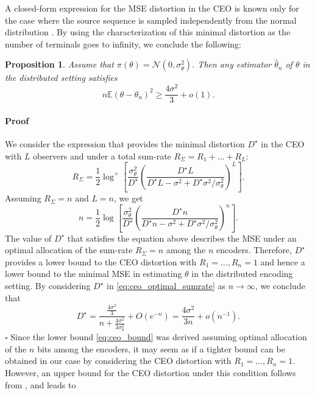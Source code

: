\documentclass[letterpaper, conference]{IEEEtran}      %
\newtheorem{prop}[thm]{\bf {Proposition}}
\newenvironment{proof}{\paragraph*{Proof}}{\hfill$\square$ \newline}
\begin{document}
A closed-form expression for the MSE distortion in the CEO is known only for the case where the source sequence is sampled independently from the normal distribution \cite{prabhakaran2004rate}. By using the characterization of this minimal distortion as the number of terminals goes to infinity, we conclude the following:
\begin{prop} \label{prop:ceo_lower_bound}
Assume that $\pi(\theta) = \mathcal N(0,\sigma_\theta^2)$. Then any estimator $\widehat{\theta}_n$ of $\theta$ in 
the distributed setting satisfies
\begin{equation} \label{eq:ceo_bound}
 n\mathbb E \left( \theta - \theta_n \right)^2 \geq \frac{4\sigma^2}{3} + o(1).
\end{equation}
\end{prop}

\begin{proof}
We consider the expression \cite[Eq. 10]{chen2004upper} that provides the minimal distortion $D^\star$ in the CEO with $L$ observers and under a total sum-rate $R_\Sigma = R_1 + \ldots +R_L$:
\begin{equation} \label{eq:ceo_optimal_sumrate}
R_{\Sigma} = \frac{1}{2} \log^+ \left[ \frac{\sigma_\theta^2}{D^\star} \left( \frac{D^\star L}{ D^\star L - \sigma^2 + D^\star \sigma^2 / \sigma_\theta^2 }\right)^L  \right].
\end{equation}
Assuming $R_\Sigma = n$ and $L=n$, we get
\begin{equation} \label{eq:ceo_optimal_sumrate}
n = \frac{1}{2} \log \left[ \frac{\sigma_\theta^2}{D^\star} \left(\frac{ D^\star n }{D^\star n - \sigma^2 + D^\star \sigma^2/\sigma_\theta^2 }  \right)^n  \right].
\end{equation}
The value of $D^\star$ that satisfies the equation above describes the MSE under an optimal allocation of the sum-rate $R_\Sigma = n$ among the $n$ encoders. Therefore, $D^\star$ provides a lower bound to the CEO distortion with $R_1=\ldots,R_n = 1$ and hence a lower bound to the minimal MSE in estimating $\theta$ in the distributed encoding setting. By considering $D^\star$ in \eqref{eq:ceo_optimal_sumrate} as $n\rightarrow \infty$, we conclude that 
\[
D^\star = \frac{ \frac{4\sigma^2}{3} }{n + \frac{4 \sigma^2}{3 \sigma_\theta^2} } + O(e^{-n}) =  \frac{4\sigma^2}{3n} + o(n^{-1}). 
\]
\end{proof}
Since the lower bound \eqref{eq:ceo_bound}  was derived assuming optimal allocation of the $n$ bits among the encoders, it may seem as if a tighter bound can be obtained in our case by considering the CEO distortion with $R_1=\ldots,R_n = 1$. However, an upper bound for the CEO distortion under this condition follows from \cite[Prop. 5.2]{KipnisRini2017}, and leads to
\end{document}
